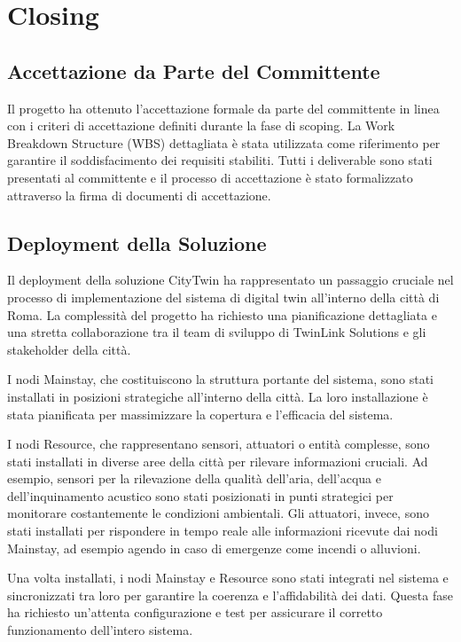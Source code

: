 \chapter{Closing}

\section{Accettazione da Parte del Committente}
Il progetto ha ottenuto l'accettazione formale da parte del committente in linea con i criteri di accettazione definiti durante la fase di scoping. La Work Breakdown Structure (WBS) dettagliata è stata utilizzata come riferimento per garantire il soddisfacimento dei requisiti stabiliti. Tutti i deliverable sono stati presentati al committente e il processo di accettazione è stato formalizzato attraverso la firma di documenti di accettazione.

\section{Deployment della Soluzione}
Il deployment della soluzione CityTwin ha rappresentato un passaggio cruciale nel processo di implementazione del sistema di digital twin all'interno della città di Roma. La complessità del progetto ha richiesto una pianificazione dettagliata e una stretta collaborazione tra il team di sviluppo di TwinLink Solutions e gli stakeholder della città.

I nodi Mainstay, che costituiscono la struttura portante del sistema, sono stati installati in posizioni strategiche all'interno della città. La loro installazione è stata pianificata per massimizzare la copertura e l'efficacia del sistema.

I nodi Resource, che rappresentano sensori, attuatori o entità complesse, sono stati installati in diverse aree della città per rilevare informazioni cruciali. Ad esempio, sensori per la rilevazione della qualità dell'aria, dell'acqua e dell'inquinamento acustico sono stati posizionati in punti strategici per monitorare costantemente le condizioni ambientali. Gli attuatori, invece, sono stati installati per rispondere in tempo reale alle informazioni ricevute dai nodi Mainstay, ad esempio agendo in caso di emergenze come incendi o alluvioni.

Una volta installati, i nodi Mainstay e Resource sono stati integrati nel sistema e sincronizzati tra loro per garantire la coerenza e l'affidabilità dei dati. Questa fase ha richiesto un'attenta configurazione e test per assicurare il corretto funzionamento dell'intero sistema.

